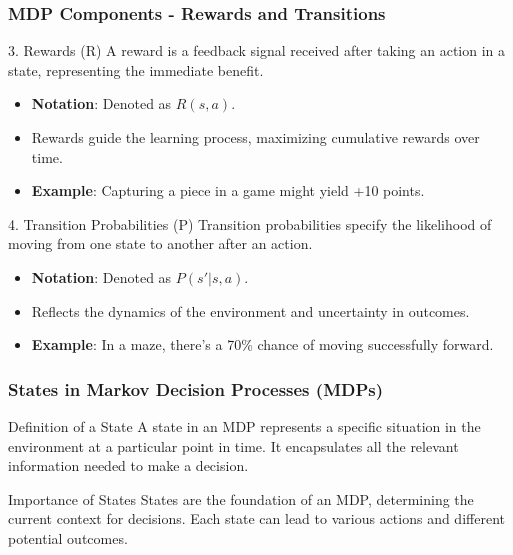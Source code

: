 \documentclass[aspectratio=169]{beamer}
\begin{document}
\begin{frame}[fragile]
    \frametitle{MDP Components - Rewards and Transitions}
    \begin{block}{3. Rewards (R)}
        A reward is a feedback signal received after taking an action in a state, representing the immediate benefit.
        \begin{itemize}
            \item \textbf{Notation}: Denoted as \( R(s, a) \).
            \item Rewards guide the learning process, maximizing cumulative rewards over time.
            \item \textbf{Example}: Capturing a piece in a game might yield +10 points.
        \end{itemize}
    \end{block}
    
    \begin{block}{4. Transition Probabilities (P)}
        Transition probabilities specify the likelihood of moving from one state to another after an action.
        \begin{itemize}
            \item \textbf{Notation}: Denoted as \( P(s' | s, a) \).
            \item Reflects the dynamics of the environment and uncertainty in outcomes.
            \item \textbf{Example}: In a maze, there’s a 70\% chance of moving successfully forward.
        \end{itemize}
    \end{block}
\end{frame}

\begin{frame}[fragile]
    \frametitle{States in Markov Decision Processes (MDPs)}
    \begin{block}{Definition of a State}
        A state in an MDP represents a specific situation in the environment at a particular point in time. It encapsulates all the relevant information needed to make a decision.
    \end{block}
    
    \begin{block}{Importance of States}
        States are the foundation of an MDP, determining the current context for decisions. Each state can lead to various actions and different potential outcomes.
    \end{block}
\end{frame}
\end{document}
